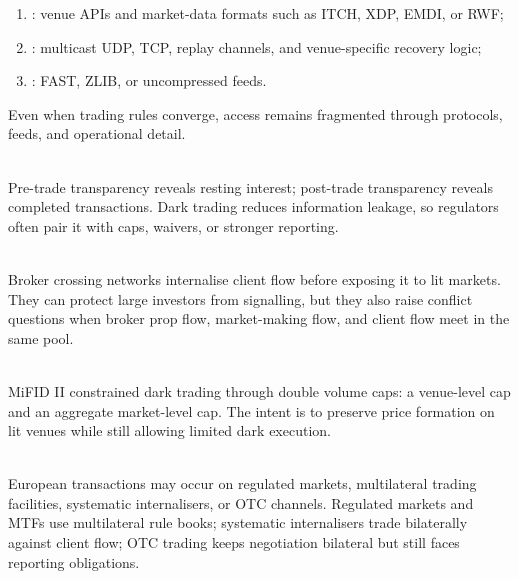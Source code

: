 \documentclass[a4paper,oneside,openany]{book}
\begin{document}
\begin{taxonomy} 
\begin{enumerate}[label=\roman*.]
\setlength{\itemsep}{0pt}
\item {}: venue APIs and market-data formats such as ITCH, XDP, EMDI, or RWF;
\item {}: multicast UDP, TCP, replay channels, and venue-specific recovery logic;
\item {}: FAST, ZLIB, or uncompressed feeds.
\end{enumerate}
Even when trading rules converge, access remains fragmented through protocols, feeds, and operational detail.
\end{taxonomy}

\begin{marketrule} \\
Pre-trade transparency reveals resting interest; post-trade transparency reveals completed transactions. Dark trading reduces information leakage, so regulators often pair it with caps, waivers, or stronger reporting.
\end{marketrule}

\begin{mechanism} \\
Broker crossing networks internalise client flow before exposing it to lit markets.\\
They can protect large investors from signalling, but they also raise conflict questions when broker prop flow, market-making flow, and client flow meet in the same pool.
\end{mechanism}

\begin{marketrule} \\
MiFID II constrained dark trading through double volume caps: a venue-level cap and an aggregate market-level cap. The intent is to preserve price formation on lit venues while still allowing limited dark execution.
\end{marketrule}

\begin{taxonomy} \\
European transactions may occur on regulated markets, multilateral trading facilities, systematic internalisers, or OTC channels. Regulated markets and MTFs use multilateral rule books; systematic internalisers trade bilaterally against client flow; OTC trading keeps negotiation bilateral but still faces reporting obligations.
\end{taxonomy}
\end{document}
